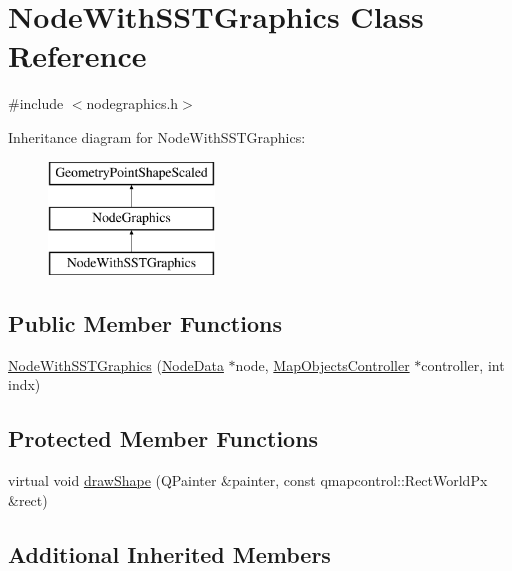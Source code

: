 \hypertarget{class_node_with_s_s_t_graphics}{}\section{Node\+With\+S\+S\+T\+Graphics Class Reference}
\label{class_node_with_s_s_t_graphics}


{\ttfamily \#include $<$nodegraphics.\+h$>$}

Inheritance diagram for Node\+With\+S\+S\+T\+Graphics\+:\begin{figure}[H]
\begin{center}
\leavevmode
\includegraphics[height=3.000000cm]{d3/da5/class_node_with_s_s_t_graphics}
\end{center}
\end{figure}
\subsection*{Public Member Functions}
\begin{DoxyCompactItemize}
\item 
\mbox{\hyperlink{class_node_with_s_s_t_graphics_a7e4cf2513f402769551adc0507af7f8c}{Node\+With\+S\+S\+T\+Graphics}} (\mbox{\hyperlink{class_node_data}{Node\+Data}} $\ast$node, \mbox{\hyperlink{class_map_objects_controller}{Map\+Objects\+Controller}} $\ast$controller, int indx)
\end{DoxyCompactItemize}
\subsection*{Protected Member Functions}
\begin{DoxyCompactItemize}
\item 
virtual void \mbox{\hyperlink{class_node_with_s_s_t_graphics_ae50446301160bc0aa54354c338bcc70b}{draw\+Shape}} (Q\+Painter \&painter, const qmapcontrol\+::\+Rect\+World\+Px \&rect)
\end{DoxyCompactItemize}
\subsection*{Additional Inherited Members}



